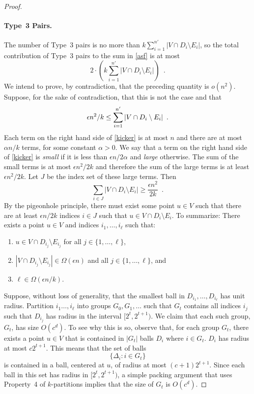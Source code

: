 \documentclass{patmorin}
\begin{document}
\begin{proof}
  \paragraph{Type~3 Pairs.}
  The number of Type~3 pairs is no more than $k\sum_{i=1}^{n'}|V\cap
  D_i\setminus E_i|$, so the total contribution of Type~3 pairs to 
  the sum in \eqref{asf} is at most
  \[
      2\cdot\left(k\sum_{i=1}^{n'} |V\cap D_i\setminus E_i|\right) \enspace .
  \]
  We intend to prove, by contradiction, that the preceding quantity
  is $o(n^2)$.  Suppose, for the sake of contradiction, that this is
  not the case and that
  \begin{equation}
    \epsilon n^2/k \le \sum_{i=1}^{n'} |V\cap D_i\setminus E_i| 
         \enspace . \eqlabel{kicker}
  \end{equation}
  Each term on the right hand side of \eqref{kicker} is at most $n$
  and there are at most $\alpha n/k$ terms, for some constant $\alpha
  >0$.  We say that a term on the right hand side of \eqref{kicker} is
  \emph{small} if it is less than $\epsilon n/2\alpha$ and \emph{large}
  otherwise.  The sum of the small terms is at most $\epsilon n^2/2k$
  and therefore the sum of the large terms is at least $\epsilon n^2/2k$.
  Let $J$ be the index set of these large terms.  Then
  \[
    \sum_{i\in J} |V\cap D_i\setminus E_i| \ge \frac{\epsilon n^2}{2k} \enspace .
  \]
  By the pigeonhole principle, there must exist some point $u\in V$
  such that there are at least $\epsilon n/2k$ indices $i\in J$ such
  that $u\in V\cap D_i\setminus E_i$.  To summarize: There exists a
  point $u\in V$ and indices $i_1,\ldots,i_\ell$ such that:
  \begin{enumerate}
     \item $u\in V\cap D_{i_j}\setminus E_{i_j}$ for all
        $j\in\{1,\ldots,\ell\}$,
     \item $|V\cap D_{i_j}\setminus E_{i_j}|\in \Omega(\epsilon n)$
       and all $j\in\{1,\ldots,\ell\}$, and
     \item $\ell\in\Omega(\epsilon n/k)$.
  \end{enumerate}

  Suppose, without loss of generality, that the smallest ball
  in $D_{i_1},\ldots,D_{i_\ell}$ has unit radius.  Partition
  $i_1\ldots,i_\ell$ into groups $G_0,G_1,\ldots$ such that $G_t$
  contains all indices $i_j$ such that $D_{i_j}$ has radius in the
  interval $[2^t,2^{t+1})$.  We claim that each such group, $G_t$, has
  size $O(c^d)$.  To see why this is so, observe that, for each group
  $G_t$, there exists a point $u\in V$ that is contained in $|G_t|$
  balls $D_{i}$ where $i\in G_t$.  $D_{i}$ has radius at most $c2^{t+1}$.
  This means that the set of balls
  \[
     \{ \Delta_i : i\in G_t\}
  \]
  is contained in a ball, centered at $u$, of radius at most
  $(c+1)2^{t+1}$.  Since each ball in this set has radius in
  $[2^t,2^{t+1})$, a simple packing argument that uses Property~4 of
  $k$-partitions implies that the size of $G_t$ is $O(c^d)$.


\end{proof}
\end{document}
